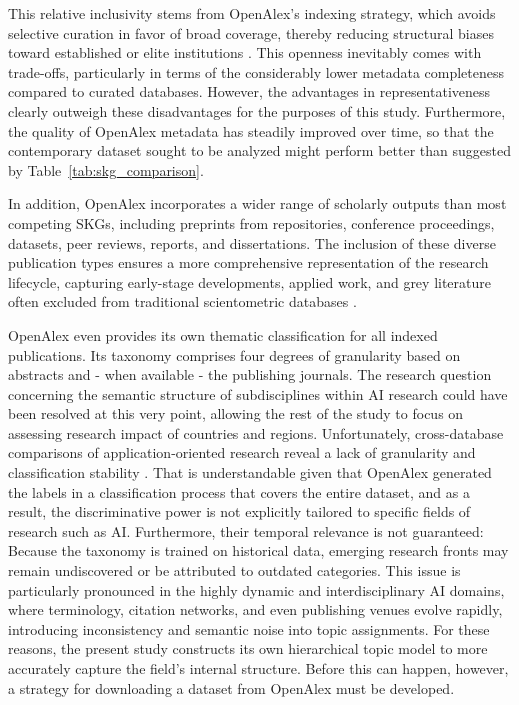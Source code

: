 \documentclass{article}
\begin{document}
	
	This relative inclusivity stems from OpenAlex’s indexing strategy, which avoids selective curation in favor of broad coverage, thereby reducing structural biases toward established or elite institutions \cite{openalex2023}. This openness inevitably comes with trade-offs, particularly in terms of the considerably lower metadata completeness compared to curated databases. However, the advantages in representativeness clearly outweigh these disadvantages for the purposes of this study. Furthermore, the quality of OpenAlex metadata has steadily improved over time, so that the contemporary dataset sought to be analyzed might perform better than suggested by Table~\ref{tab:skg_comparison}.
	
	In addition, OpenAlex incorporates a wider range of scholarly outputs than most competing SKGs, including preprints from repositories, conference proceedings, datasets, peer reviews, reports, and dissertations. The inclusion of these diverse publication types ensures a more comprehensive representation of the research lifecycle, capturing early-stage developments, applied work, and grey literature often excluded from traditional scientometric databases \cite{weimer2023quantification}.
	
	OpenAlex even provides its own thematic classification for all indexed publications. Its taxonomy comprises four degrees of granularity based on abstracts and - when available - the publishing journals. The research question concerning the semantic structure of subdisciplines within AI research could have been resolved at this very point, allowing the rest of the study to focus on assessing research impact of countries and regions. Unfortunately, cross-database comparisons of application-oriented research reveal a lack of granularity \cite{stansfield2025analyzing} and classification stability \cite{haunschild2024use}. That is understandable given that OpenAlex generated the labels in a classification process that covers the entire dataset, and as a result, the discriminative power is not explicitly tailored to specific fields of research such as AI. Furthermore, their temporal relevance is not guaranteed: Because the taxonomy is trained on historical data, emerging research fronts may remain undiscovered or be attributed to outdated categories. This issue is particularly pronounced in the highly dynamic and interdisciplinary AI domains, where terminology, citation networks, and even publishing venues evolve rapidly, introducing inconsistency and semantic noise into topic assignments. For these reasons, the present study constructs its own hierarchical topic model to more accurately capture the field's internal structure. Before this can happen, however, a strategy for downloading a dataset from OpenAlex must be developed.
	
\end{document}
